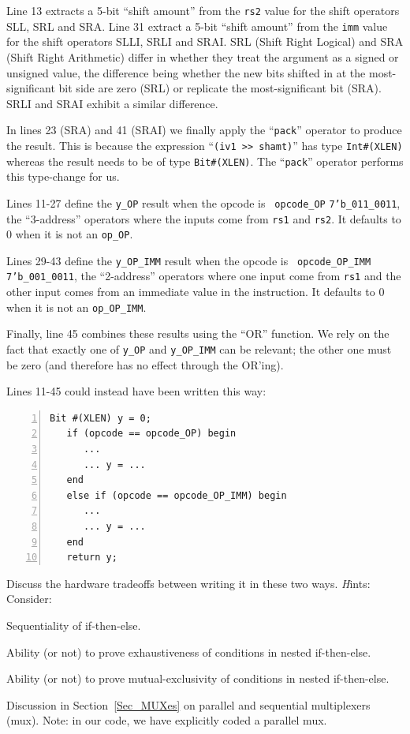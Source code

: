 Line 13 extracts a 5-bit ``shift amount'' from the {\tt rs2} value for
the shift operators SLL, SRL and SRA.  Line 31 extract a 5-bit ``shift
amount'' from the {\tt imm} value for the shift operators SLLI, SRLI
and SRAI.  SRL (Shift Right Logical) and SRA (Shift Right Arithmetic)
differ in whether they treat the argument as a signed or unsigned
value, the difference being whether the new bits shifted in at the
most-significant bit side are zero (SRL) or replicate the
most-significant bit (SRA).  SRLI and SRAI exhibit a similar
difference.

In lines 23 (SRA) and 41 (SRAI) we finally apply the ``{\tt pack}''
operator to produce the result. This is because the expression
``\verb|(iv1 >> shamt)|'' has type {\tt Int\#(XLEN)} whereas the
result needs to be of type {\tt Bit\#(XLEN)}.  The ``{\tt pack}''
operator performs this type-change for us.

Lines 11-27 define the {\tt y\_OP} result when the opcode is {\tt
opcode\_OP} {\ie} {\tt 7'b\_011\_0011}, {\ie} the ``3-address''
operators where the inputs come from {\tt rs1} and {\tt rs2}.
It defaults to 0 when it is not an {\tt op\_OP}.

Lines 29-43 define the {\tt y\_OP\_IMM} result when the opcode is {\tt
opcode\_OP\_IMM} {\ie} {\tt 7'b\_001\_0011}, {\ie} the ``2-address''
operators where one input come from {\tt rs1} and the other input
comes from an immediate value in the instruction.
It defaults to 0 when it is not an {\tt op\_OP\_IMM}.

Finally, line 45 combines these results using the ``OR'' function.  We
rely on the fact that exactly one of \verb|y_OP| and \verb|y_OP_IMM|
can be relevant; the other one must be zero (and therefore has no
effect through the OR'ing).

\hdivider

\Exercise

Lines 11-45 could instead have been written this way:

{\small
\begin{Verbatim}[frame=single, numbers=left]
   Bit #(XLEN) y = 0;
   if (opcode == opcode_OP) begin
      ...
      ... y = ...
   end
   else if (opcode == opcode_OP_IMM) begin
      ...
      ... y = ...
   end
   return y;
\end{Verbatim}
}

Discuss the hardware tradeoffs between writing it in these two ways.
{\emph Hints:} Consider:

\begin{tightlist}

  \item Sequentiality of if-then-else.
  \item Ability (or not) to prove exhaustiveness of conditions in nested if-then-else.
  \item Ability (or not) to prove mutual-exclusivity of conditions in nested if-then-else.
  \item Discussion in Section~\ref{Sec_MUXes} on parallel and
    sequential multiplexers (mux).  Note: in our code, we have
    explicitly coded a parallel mux.

\end{tightlist}

